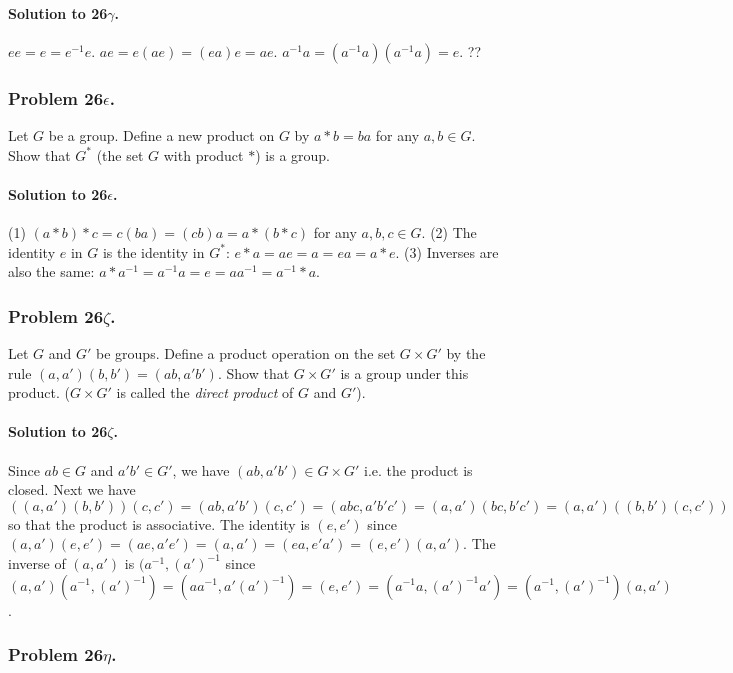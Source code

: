 \paragraph*{Solution to 26$\gamma$.}
$ ee = e = e^{-1} e $.
$ae = e(ae) = (ea)e = ae $.
$a^{-1} a = (a^{-1} a) (a^{-1} a) = e$.
??

\subsubsection{Problem 26$\epsilon$.}
Let $G$ be a group. Define a new product on $G$ by $a * b = ba $ for any
$a, b \in G$. Show that $G^*$ (the set $G$ with product $*$) is a group.

\paragraph*{Solution to 26$\epsilon$.}
(1) $(a*b)*c = c(ba) = (cb)a = a*(b*c)$ for any $a, b, c \in G$. (2) The identity
$e$ in $G$ is the identity in $G^*$: $e * a = ae = a = ea = a * e$.
(3) Inverses are also the same: $a * a^{-1} = a^{-1} a = e = a a^{-1} = a^{-1} * a$.

\subsubsection{Problem 26$\zeta$.}
Let $G$ and $G'$ be groups. Define a product operation on the set $G \times G'$ by the
rule $(a, a')(b, b') = (ab, a'b')$. Show that $G \times G'$ is a group under this
product. ($G \times G'$ is called the \textit{direct product} of $G$ and $G'$).

\paragraph*{Solution to 26$\zeta$.}
Since $ab \in G$ and $a'b' \in G'$, we have $(ab, a'b') \in G \times G'$ i.e. the
product is closed. Next we have $((a,a')(b,b'))(c,c') = (ab, a'b')(c,c') =
(abc, a'b'c') = (a, a')(bc, b'c') = (a,a')((b,b')(c,c')) $ so that the product
is associative. The identity is $(e, e')$ since $(a,a')(e,e') = (ae, a'e') =
(a,a') = (ea, e'a') = (e,e')(a,a')$. The inverse of $(a, a')$ is $(a^{-1},(a')^{-1}$
since $(a,a')(a^{-1},(a')^{-1}) = (aa^{-1},a'(a')^{-1}) = (e,e') =
(a^{-1}a, (a')^{-1}a') = (a^{-1},(a')^{-1})(a,a')$.

\subsubsection{Problem 26$\eta$.}

